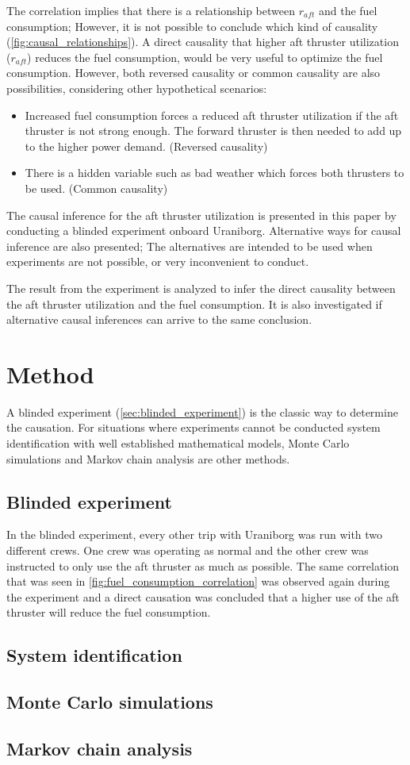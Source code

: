\documentclass[fleqn,10pt]{olplainarticle}
\begin{document}
The correlation implies that there is a relationship between $r_{aft}$ and the fuel consumption; However, it is not possible to conclude which kind of causality (\autoref{fig:causal_relationships}). A direct causality that higher aft thruster utilization ($r_{aft}$) reduces the fuel consumption, would be very useful to optimize the fuel consumption. However, both reversed causality or common causality are also possibilities, considering other hypothetical scenarios:
\begin{itemize}
    \item Increased fuel consumption forces a reduced aft thruster utilization if the aft thruster is not strong enough. The forward thruster is then needed to add up to the higher power demand. (Reversed causality)
    
    \item There is a hidden variable such as bad weather which forces both thrusters to be used. (Common causality)
\end{itemize}
The causal inference for the aft thruster utilization is presented in this paper by conducting a blinded experiment onboard Uraniborg. Alternative ways for causal inference are also presented; The alternatives are intended to be used when experiments are not possible, or very inconvenient to conduct.

The result from the experiment is analyzed to infer the direct causality between the aft thruster utilization and the fuel consumption. It is also investigated if alternative causal inferences can arrive to the same conclusion.  

\section{Method}
A blinded experiment (\autoref{sec:blinded_experiment}) is the classic way to determine the causation. For situations where experiments cannot be conducted system identification with well established
mathematical models, Monte Carlo simulations and Markov chain analysis are other methods.

\subsection{Blinded experiment}\label{sec:blinded_experiment}
In the blinded experiment, every other trip with Uraniborg was run with two different crews. One crew was operating as normal and the other crew was instructed to only use the aft thruster as much as possible. The same correlation that was seen in \autoref{fig:fuel_consumption_correlation} was observed again during the experiment and a direct causation was concluded that a higher use of the aft thruster will reduce the fuel consumption.

\subsection{System identification}
\subsection{Monte Carlo simulations}
\subsection{Markov chain analysis}


\end{document}
